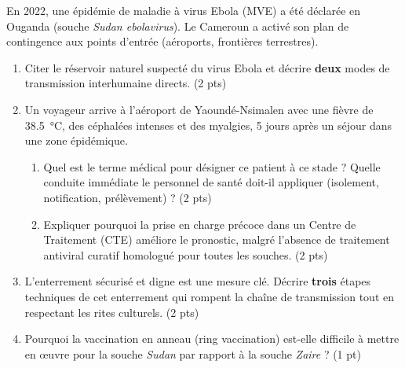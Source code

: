 \documentclass[11pt]{article}
\begin{document}
\begin{exercice}
En 2022, une épidémie de maladie à virus Ebola (MVE) a été déclarée en Ouganda (souche \textit{Sudan ebolavirus}). Le Cameroun a activé son plan de contingence aux points d'entrée (aéroports, frontières terrestres).
\begin{enumerate}
    \item Citer le réservoir naturel suspecté du virus Ebola et décrire \textbf{deux} modes de transmission interhumaine directs. (2 pts)
    \item Un voyageur arrive à l'aéroport de Yaoundé-Nsimalen avec une fièvre de \SI{38,5}{\degreeCelsius}, des céphalées intenses et des myalgies, \num{5} jours après un séjour dans une zone épidémique. 
    \begin{enumerate}
        \item Quel est le terme médical pour désigner ce patient à ce stade ? Quelle conduite immédiate le personnel de santé doit-il appliquer (isolement, notification, prélèvement) ? (2 pts)
        \item Expliquer pourquoi la prise en charge précoce dans un Centre de Traitement (CTE) améliore le pronostic, malgré l'absence de traitement antiviral curatif homologué pour toutes les souches. (2 pts)
    \end{enumerate}
    \item L'enterrement sécurisé et digne est une mesure clé. Décrire \textbf{trois} étapes techniques de cet enterrement qui rompent la chaîne de transmission tout en respectant les rites culturels. (2 pts)
    \item Pourquoi la vaccination en anneau (ring vaccination) est-elle difficile à mettre en œuvre pour la souche \textit{Sudan} par rapport à la souche \textit{Zaire} ? (1 pt)
\end{enumerate}
\end{exercice}
\end{document}
